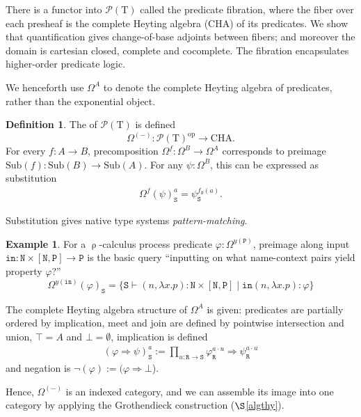 \documentclass[12pt]{article}
\theoremstyle{definition}
\newtheorem{definition}[theorem]{Definition}
\newtheorem{example}[theorem]{Example}
\newcommand{\define}[1]{{\bf \boldmath{#1}}}
\newcommand{\msc}[1]{\mathscr{#1}}
\newcommand{\mrm}[1]{\mathrm{#1}}
\newcommand{\mtt}[1]{\mathtt{#1}}
\newcommand{\ra}{\Rightarrow}
\newcommand{\op}{\mrm{op}}
\newcommand{\T}{\mrm{T}}
\newcommand{\Sub}{\mrm{Sub}}
\newcommand{\CHA}{\mrm{CHA}}
\newcommand{\pow}{\msc{P}}
\newcommand{\ttr}{\mtt{R}}
\newcommand{\tts}{\mtt{S}}
\newcommand{\N}{\mtt{N}}
\newcommand{\PP}{\mtt{P}}
\newcommand{\tti}{\mtt{in}}
\begin{document}
There is a functor into $\pow(\T)$ called the predicate fibration, where the fiber over each presheaf is the complete Heyting algebra (CHA) of its predicates. We show that quantification gives change-of-base adjoints between fibers; and moreover the domain is cartesian closed, complete and cocomplete. The fibration encapsulates higher-order predicate logic.

We henceforth use $\Omega^A$ to denote the complete Heyting algebra of predicates, rather than the exponential object.

\begin{definition}
    The \define{predicate functor} of $\pow(\T)$ is defined
    \[\Omega^{(-)}:\pow(\T)^\op\to \CHA.\]
    For every $f:A\to B$, precomposition $\Omega^f:\Omega^B\to \Omega^A$ corresponds to preimage $\Sub(f):\Sub(B)\to \Sub(A)$. For any $\psi:\Omega^B$, this can be expressed as substitution
    \begin{eqnarray}
        \Omega^f(\psi)_\tts^a = \psi_\tts^{f_\tts(a)}.
    \end{eqnarray}
\end{definition}

Substitution gives native type systems \textit{pattern-matching}.

\begin{example}
    For a $\uprho$-calculus process predicate $\varphi:\Omega^{y(\PP)}$, preimage along input $\tti:\N\times [\N,\PP]\to \PP$ is the basic query ``inputting on what name-context pairs yield property $\varphi$?''
    \[\Omega^{y(\tti)}(\varphi)_\tts = \{\tts\vdash (n,\lambda x.p):\N\times [\N,\PP] \;|\; \tti(n,\lambda x.p):\varphi\}\]
\end{example}

The complete Heyting algebra structure of $\Omega^A$ is given: predicates are partially ordered by implication, meet and join are defined by pointwise intersection and union, $\top = A$ and $\bot = \emptyset$, implication is defined
\begin{eqnarray}
    (\varphi\ra \psi)_\tts^a := \prod_{u:\ttr\to\tts} \varphi_\ttr^{a\cdot u}\ra \psi_\ttr^{a\cdot u}
\end{eqnarray}
and negation is $\neg(\varphi):= (\varphi \ra \bot$).

Hence, $\Omega^{(-)}$ is an indexed category, and we can assemble its image into one category by applying the Grothendieck construction ($\S$\ref{algthy}).
\end{document}

